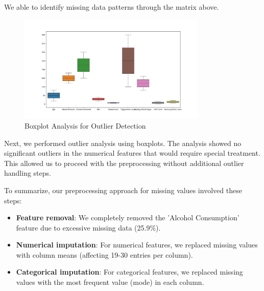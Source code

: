 \documentclass[11pt,a4paper]{article}
\begin{document}

We able to identify missing data patterns through the matrix above.

\begin{figure}[H]
    \centering
    \includegraphics[width=0.8\textwidth]{./pictures/outliers.png}
    \caption{Boxplot Analysis for Outlier Detection}
\end{figure}

Next, we performed outlier analysis using boxplots.
The analysis showed no significant outliers in
the numerical features that would require special treatment.
This allowed us to proceed with the preprocessing without additional outlier handling steps.

To summarize, our preprocessing approach for missing values involved these steps:

\vspace{-0.25cm}
\begin{itemize}
    \vspace{-0.25cm}
    \item \textbf{Feature removal}: We completely removed the 'Alcohol Consumption' feature due to excessive missing data (25.9\%).
          \vspace{-0.25cm}
    \item \textbf{Numerical imputation}: For numerical features, we replaced missing values with column means (affecting 19-30 entries per column).
          \vspace{-0.25cm}
    \item \textbf{Categorical imputation}: For categorical features, we replaced missing values with the most frequent value (mode) in each column.
\end{itemize}
\end{document}
